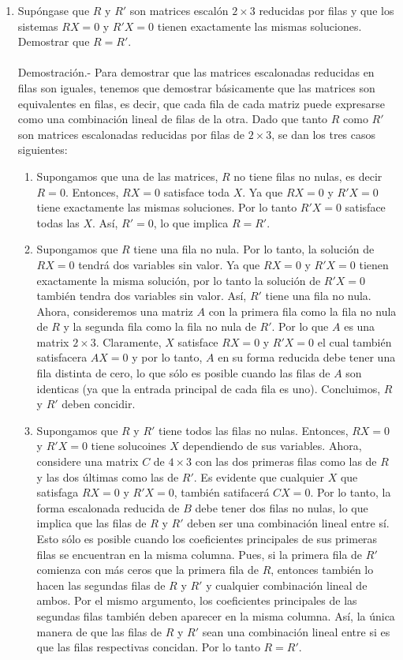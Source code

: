 \begin{enumerate}[\bfseries 1.]
    \item Supóngase que $R$ y $R'$ son matrices escalón $2\times 3$ reducidas por filas y que los sistemas $RX=0$ y $R'X=0$ tienen exactamente las mismas soluciones. Demostrar que $R=R'$.\\\\
	Demostración.-\; Para demostrar que las matrices escalonadas reducidas en filas son iguales, tenemos que demostrar básicamente que las matrices son equivalentes en filas, es decir, que cada fila de cada matriz puede expresarse como una combinación lineal de filas de la otra. Dado que tanto $R$ como $R'$ son matrices escalonadas reducidas por filas de $2\times 3$, se dan los tres casos siguientes:
	\begin{enumerate}
	    \item Supongamos que una de las matrices, $R$ no tiene filas no nulas, es decir $R=0$. Entonces, $RX=0$ satisface toda $X$. Ya que $RX=0$ y $R'X=0$ tiene exactamente las mismas soluciones. Por lo tanto $R'X=0$ satisface todas las $X$. Así, $R'=0$, lo que implica $R=R'$.

	    \item Supongamos que $R$ tiene una fila no nula. Por lo tanto, la solución de $RX=0$ tendrá dos variables sin valor. Ya que $RX=0$ y $R'X=0$ tienen exactamente la misma solución, por lo tanto la solución de $R'X=0$ también tendra dos variables sin valor. Así, $R'$ tiene una fila no nula. Ahora, consideremos una matriz $A$ con la primera fila como la fila no nula de $R$ y la segunda fila como la fila no nula de $R'$. Por lo que $A$ es una matrix $2\times 3$. Claramente, $X$ satisface $RX=0$ y $R'X=0$ el cual también satisfacera $AX=0$ y por lo tanto, $A$ en su forma reducida debe tener una fila distinta de cero, lo que sólo es posible cuando las filas de $A$ son identicas (ya que la entrada principal de cada fila es uno). Concluimos, $R$ y $R'$ deben concidir.

	    \item Supongamos que $R$ y $R'$ tiene todos las filas no nulas. Entonces, $RX=0$ y $R'X=0$ tiene solucoines $X$ dependiendo de sus variables. Ahora, considere una matrix $C$ de $4\times 3$ con las dos primeras filas como las de $R$ y las dos últimas como las de $R'$. Es evidente que cualquier $X$ que satisfaga $RX=0$ y $R'X=0$, también satifacerá $CX=0$. Por lo tanto, la forma escalonada reducida de $B$ debe tener dos filas no nulas, lo que implica que las filas de $R$ y $R'$ deben ser una combinación lineal entre sí. Esto sólo es posible cuando los coeficientes principales de sus primeras filas se encuentran en la misma columna. Pues, si la primera fila de $R'$ comienza con más ceros que la primera fila de $R$, entonces también lo hacen las segundas filas de $R$ y $R'$ y cualquier combinación lineal de ambos. Por el mismo argumento, los coeficientes principales de las segundas filas también deben aparecer en la misma columna. Así, la única manera de que las filas de $R$ y $R'$ sean una combinación lineal entre si es que las filas respectivas concidan. Por lo tanto $R=R'$.\\\\
	\end{enumerate}


\end{enumerate}
